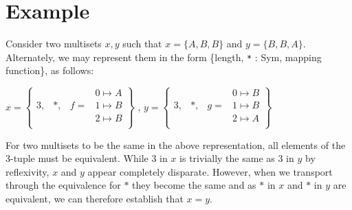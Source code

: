 \documentclass[12pt]{report}
\begin{document}
\section{Example}
Consider two multisets $x,y$ such that $x = \{A,B,B\}$ and $y = \{B,B,A\}$. Alternately, we may represent them in the form \{length, \texttt{*} : Sym, mapping function\}, as follows:
\begin{center}
$x = \begin{Bmatrix}
   &  &  & 0 \mapsto A \\
  3, & *,& f = & 1 \mapsto B \\
    &   &  & 2 \mapsto B \\
 \end{Bmatrix}$
,
$y = \begin{Bmatrix}
   &  &  & 0 \mapsto B \\
  3, & *,& g = & 1 \mapsto B \\
    &   &  & 2 \mapsto A \\
 \end{Bmatrix}$
\end{center}

For two multisets to be the same in the above representation, all elements of the 3-tuple must be equivalent. While 3 in $x$ is trivially the same as 3 in $y$ by reflexivity, $x$ and $y$ appear completely disparate. However, when we transport through the equivalence for $*$ they become the same and as $*$ in $x$ and $*$ in $y$ are equivalent, we can therefore establish that $x = y$.  
\end{document}
